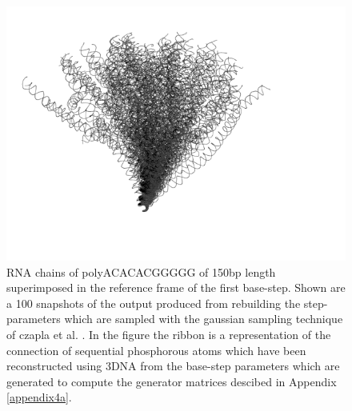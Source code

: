 \begin{figure}
\centering
\includegraphics[angle=0, scale=0.6]{Chapter4/polyacacacggggg_all.png}
\caption{RNA chains of polyACACACGGGGG of 150bp length superimposed in
  the  reference  frame  of  the  first base-step.  Shown  are  a  100
  snapshots of the output produced from rebuilding the step-parameters
  which are sampled with the  gaussian sampling technique of czapla et
  al. \cite{czapla2006}.  In the figure the ribbon is a representation
  of the  connection of sequential  phosphorous atoms which  have been
  reconstructed  using 3DNA  from the  base-step parameters  which are
  generated  to compute  the generator  matrices descibed  in Appendix
  \ref{appendix4a}.}
\label{rnatree}
\end{figure}  


















